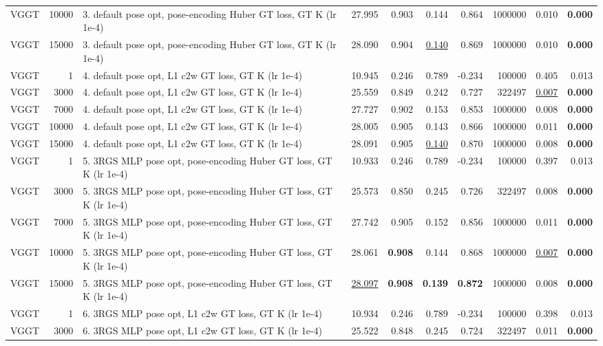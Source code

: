 \begin{table}[H]
\begin{tabular}{lrlrrrrrrr}
VGGT & 10000 & 3. default pose opt, pose-encoding Huber GT loss, GT K (lr 1e-4) & 27.995 & 0.903 & 0.144 & 0.864 & 1000000 & 0.010 & \textbf{0.000} \\
VGGT & 15000 & 3. default pose opt, pose-encoding Huber GT loss, GT K (lr 1e-4) & 28.090 & 0.904 & \underline{0.140} & 0.869 & 1000000 & 0.010 & \textbf{0.000} \\
VGGT & 1 & 4. default pose opt, L1 c2w GT loss, GT K (lr 1e-4) & 10.945 & 0.246 & 0.789 & -0.234 & 100000 & 0.405 & 0.013 \\
VGGT & 3000 & 4. default pose opt, L1 c2w GT loss, GT K (lr 1e-4) & 25.559 & 0.849 & 0.242 & 0.727 & 322497 & \underline{0.007} & \textbf{0.000} \\
VGGT & 7000 & 4. default pose opt, L1 c2w GT loss, GT K (lr 1e-4) & 27.727 & 0.902 & 0.153 & 0.853 & 1000000 & 0.008 & \textbf{0.000} \\
VGGT & 10000 & 4. default pose opt, L1 c2w GT loss, GT K (lr 1e-4) & 28.005 & 0.905 & 0.143 & 0.866 & 1000000 & 0.011 & \textbf{0.000} \\
VGGT & 15000 & 4. default pose opt, L1 c2w GT loss, GT K (lr 1e-4) & 28.091 & 0.905 & \underline{0.140} & 0.870 & 1000000 & 0.008 & \textbf{0.000} \\
VGGT & 1 & 5. 3RGS MLP pose opt, pose-encoding Huber GT loss, GT K (lr 1e-4) & 10.933 & 0.246 & 0.789 & -0.234 & 100000 & 0.397 & 0.013 \\
VGGT & 3000 & 5. 3RGS MLP pose opt, pose-encoding Huber GT loss, GT K (lr 1e-4) & 25.573 & 0.850 & 0.245 & 0.726 & 322497 & 0.008 & \textbf{0.000} \\
VGGT & 7000 & 5. 3RGS MLP pose opt, pose-encoding Huber GT loss, GT K (lr 1e-4) & 27.742 & 0.905 & 0.152 & 0.856 & 1000000 & 0.011 & \textbf{0.000} \\
VGGT & 10000 & 5. 3RGS MLP pose opt, pose-encoding Huber GT loss, GT K (lr 1e-4) & 28.061 & \textbf{0.908} & 0.144 & 0.868 & 1000000 & \underline{0.007} & \textbf{0.000} \\
VGGT & 15000 & 5. 3RGS MLP pose opt, pose-encoding Huber GT loss, GT K (lr 1e-4) & \underline{28.097} & \textbf{0.908} & \textbf{0.139} & \textbf{0.872} & 1000000 & 0.008 & \textbf{0.000} \\
VGGT & 1 & 6. 3RGS MLP pose opt, L1 c2w GT loss, GT K (lr 1e-4) & 10.934 & 0.246 & 0.789 & -0.234 & 100000 & 0.398 & 0.013 \\
VGGT & 3000 & 6. 3RGS MLP pose opt, L1 c2w GT loss, GT K (lr 1e-4) & 25.522 & 0.848 & 0.245 & 0.724 & 322497 & 0.011 & \textbf{0.000} \\

\end{tabular}
\end{table}
